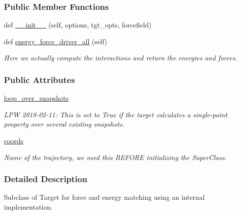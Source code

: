 \subsubsection*{Public Member Functions}
\begin{DoxyCompactItemize}
\item 
def \hyperlink{classsrc_1_1abinitio__internal_1_1AbInitio__Internal_a51e97c29918e5b7cedf4cffbc4ccb675}{\+\_\+\+\_\+init\+\_\+\+\_\+} (self, options, tgt\+\_\+opts, forcefield)
\item 
def \hyperlink{classsrc_1_1abinitio__internal_1_1AbInitio__Internal_a0711007b1a7bcb9c64c01bf68ff1e3c0}{energy\+\_\+force\+\_\+driver\+\_\+all} (self)
\begin{DoxyCompactList}\small\item\em Here we actually compute the interactions and return the energies and forces. \end{DoxyCompactList}\end{DoxyCompactItemize}
\subsubsection*{Public Attributes}
\begin{DoxyCompactItemize}
\item 
\hyperlink{classsrc_1_1abinitio__internal_1_1AbInitio__Internal_a1b4e68c1db6ca2b90883340aa40cdf46}{loop\+\_\+over\+\_\+snapshots}
\begin{DoxyCompactList}\small\item\em L\+PW 2018-\/02-\/11\+: This is set to True if the target calculates a single-\/point property over several existing snapshots. \end{DoxyCompactList}\item 
\hyperlink{classsrc_1_1abinitio__internal_1_1AbInitio__Internal_a8cb292fcebe9baf4dfa6e6566a472048}{coords}
\begin{DoxyCompactList}\small\item\em Name of the trajectory, we need this B\+E\+F\+O\+RE initializing the Super\+Class. \end{DoxyCompactList}\end{DoxyCompactItemize}


\subsubsection{Detailed Description}
Subclass of Target for force and energy matching using an internal implementation. 

